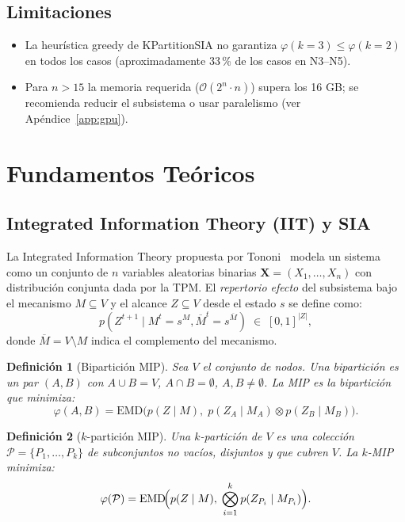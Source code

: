 \documentclass[11pt,letterpaper]{article}
\newcommand{\EMD}{\mathrm{EMD}}
\newcommand{\phi}{\varphi}
\newcommand{\parti}{\mathcal{P}}
\newtheorem{definition}{Definición}[section]
\begin{document}
\subsection{Limitaciones}

\begin{itemize}
  \item La heurística greedy de KPartitionSIA no garantiza
        $\phi(k{=}3) \le \phi(k{=}2)$ en todos los casos (aproximadamente
        33\,\% de los casos en N3--N5).
  \item Para $n > 15$ la memoria requerida ($\mathcal{O}(2^n \cdot n)$) supera
        los 16 GB; se recomienda reducir el subsistema o usar paralelismo
        (ver Apéndice~\ref{app:gpu}).
\end{itemize}

\section{Fundamentos Teóricos}
\label{sec:teoria}

\subsection{Integrated Information Theory (IIT) y SIA}

La Integrated Information Theory propuesta por Tononi~\cite{tononi2016} modela
un sistema como un conjunto de $n$ variables aleatorias binarias
$\mathbf{X} = (X_1,\ldots,X_n)$ con distribución conjunta dada por la TPM.
El \emph{repertorio efecto} del subsistema bajo el mecanismo $M \subseteq V$
y el alcance $Z \subseteq V$ desde el estado $s$ se define como:
\[
  p(Z^{t+1} \mid M^t = s^M, \overline{M}^t = s^{\overline{M}}) 
  \;\in\; [0,1]^{|Z|},
\]
donde $\overline{M} = V \setminus M$ indica el complemento del mecanismo.

\begin{definition}[Bipartición MIP]
  Sea $V$ el conjunto de nodos. Una \emph{bipartición} es un par
  $(A, B)$ con $A \cup B = V$, $A \cap B = \emptyset$, $A,B \ne \emptyset$.
  La \emph{MIP} es la bipartición que minimiza:
  \[
    \phi(A,B) = \EMD\bigl(p(Z \mid M),\;p(Z_A \mid M_A) \otimes p(Z_B \mid M_B)\bigr).
  \]
\end{definition}

\begin{definition}[$k$-partición MIP]
  Una $k$-partición de $V$ es una colección $\parti = \{P_1,\ldots,P_k\}$ de
  subconjuntos no vacíos, disjuntos y que cubren $V$.  La $k$-MIP minimiza:
  \[
    \phi(\parti) = \EMD\!\Bigl(p(Z \mid M),\;
                               \bigotimes_{i=1}^k p(Z_{P_i} \mid M_{P_i})\Bigr).
  \]
\end{definition}
\end{document}
